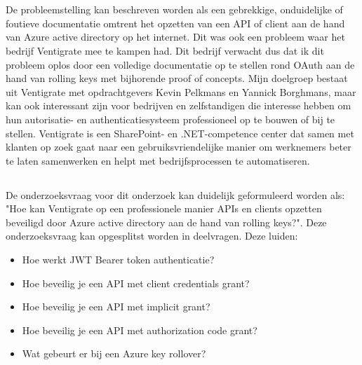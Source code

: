 
\chapter{}
\label{ch:inleiding}
\section{}
\label{sec:probleemstelling}

De probleemstelling kan beschreven worden als een gebrekkige, onduidelijke of foutieve documentatie omtrent het opzetten van een API of client aan de hand van Azure active directory op het internet. Dit was ook een probleem waar het bedrijf Ventigrate mee te kampen had. Dit bedrijf verwacht dus dat ik dit probleem oplos door een volledige documentatie op te stellen rond OAuth aan de hand van rolling keys met bijhorende proof of concepts. \newline\newline
Mijn doelgroep bestaat uit Ventigrate met opdrachtgevers Kevin Pelkmans en Yannick Borghmans, maar kan ook interessant zijn voor bedrijven en zelfstandigen die interesse hebben om hun autorisatie- en authenticatiesysteem professioneel op te bouwen of bij te stellen.\newline\newline
Ventigrate is een SharePoint- en .NET-competence center dat samen met klanten op zoek gaat naar een gebruiksvriendelijke manier om werknemers beter te laten samenwerken en helpt met bedrijfsprocessen te automatiseren.

\section{}
\label{sec:onderzoeksvraag}

De onderzoeksvraag voor dit onderzoek kan duidelijk geformuleerd worden als: "Hoe kan Ventigrate op een professionele manier APIs en clients opzetten beveiligd door Azure active directory aan de hand van rolling keys?".\newline
Deze onderzoeksvraag kan opgesplitst worden in deelvragen. Deze luiden:
\begin{itemize}
	\item Hoe werkt JWT Bearer token authenticatie?
	\item Hoe beveilig je een API met client credentials grant?
	\item Hoe beveilig je een API met implicit grant?
	\item Hoe beveilig je een API met authorization code grant?
	\item Wat gebeurt er bij een Azure key rollover?
\end{itemize}

